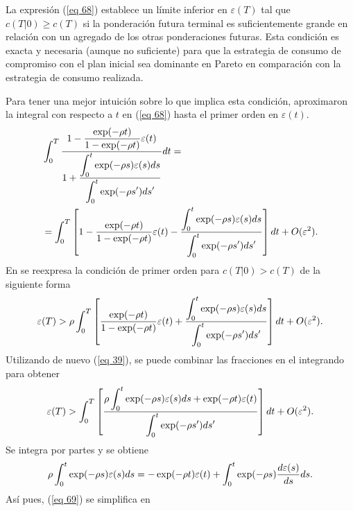 La expresión (\ref{eq 68}) establece un límite inferior en $\varepsilon(T)$ tal que $c(T|0) \geq c(T)$ si la ponderación futura terminal es suficientemente grande en relación con un agregado de los otras ponderaciones futuras. 
Esta condición es exacta y necesaria (aunque no suficiente) para que la estrategia de consumo de compromiso con el plan inicial sea dominante en Pareto en comparación con la estrategia de consumo realizada.

Para tener una mejor intuición sobre lo que implica esta condición, \parencite{feigenbaum2021deviation} aproximaron la integral con respecto a $t$ en (\ref{eq 68}) hasta el primer orden en $\varepsilon(t)$.
\begin{equation*}
    \begin{split}
   &\displaystyle \int_0^T \dfrac{1- \dfrac{\exp ( - \rho t)}{1- \exp ( - \rho t)} \varepsilon(t)}{1+ \dfrac{\displaystyle \int_0^t \exp (- \rho s) \varepsilon(s)ds}{\displaystyle \int_0^t \exp(- \rho s') ds'}} dt =\\ 
   &= \displaystyle \int_0^T \left[1- \dfrac{\exp ( - \rho t)}{1- \exp ( - \rho t)} \varepsilon(t) - \dfrac{\displaystyle \int_0^t \exp (- \rho s) \varepsilon(s)ds}{\displaystyle \int_0^t \exp(- \rho s') ds'}\right]dt + O(\varepsilon^2). 
\end{split}
\end{equation*}
%
\noindent En \parencite{feigenbaum2021deviation} se reexpresa la condición de primer orden para $c(T|0) > c(T)$ de la siguiente forma 
\begin{equation}
\label{eq 69}
\varepsilon(T)> \rho \displaystyle \int_0^T \left[\dfrac{\exp ( - \rho t)}{1- \exp ( - \rho t)} \varepsilon(t) + \dfrac{\displaystyle \int_0^t \exp (- \rho s) \varepsilon(s)ds}{\displaystyle \int_0^t \exp(- \rho s') ds'}\right]dt + O(\varepsilon^2) .
\end{equation}
%
\noindent Utilizando de nuevo (\ref{eq 39}), se puede combinar las fracciones en el integrando para obtener
%
\begin{equation*}
\varepsilon(T)> \displaystyle \int_0^T \left[\dfrac{\rho \displaystyle \int_0^t\exp ( - \rho s) \varepsilon(s) ds + \exp (- \rho t) \varepsilon(t)}{\displaystyle \int_0^t \exp(- \rho s') ds'} \right]dt + O(\varepsilon^2) .
\end{equation*}
%
\noindent Se integra por partes y se obtiene
%
\begin{equation}
\label{eq 70}
\rho \displaystyle \int_0^t \exp (- \rho s) \varepsilon(s) ds  = - \exp (- \rho t) \varepsilon(t) + \displaystyle \int_0^t \exp (- \rho s) \dfrac{d\varepsilon(s) }{ds} ds.
\end{equation}
%
\noindent Así pues, (\ref{eq 69}) se simplifica en

